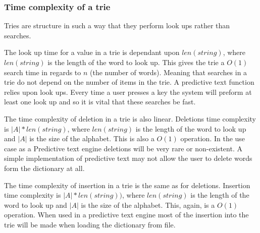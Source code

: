\documentclass[10pt]{article} %
\begin{document}
			\subsubsection{Time complexity of a trie}
			    Tries are structure in such a way that they perform look ups rather than searches.
			
				The look up time for a value in a trie is dependant upon \begin{math}len(string)\end{math}, where \begin{math}len(string)\end{math} is the length of the word to look up\cite{book:ADS:complexity}. This gives the trie a \begin{math} O(1) \end{math} search time in regards to \begin{math} n \end{math} (the number of words). Meaning that searches in a trie do not depend on the number of items in the trie. A predictive text function relies upon look ups. Every time a user presses a key the system will preform at least one look up and so it is vital that these searches be fast. 
				
				The time complexity of deletion in a trie is also linear. Deletions time complexity is 
				\begin{math}\vert A \vert * len(string)\end{math}, where \begin{math}len(string)\end{math} is the length of the word to look up and \begin{math}\vert A \vert \end{math} is the size of the alphabet\cite{book:ADS:complexity}.
				This is also a \begin{math} O(1) \end{math} operation.
				In the use case as a Predictive text engine deletions will be very rare or non-existent.
				A simple implementation of predictive text may not allow the user to delete words form the dictionary at all. 
				
				The time complexity of insertion in a trie is the same as for deletions. Insertion time complexity is \begin{math}\vert A \vert  * len(string))\end{math}, where \begin{math}len(string)\end{math} is the length of the word to look up and \begin{math}\vert A \vert \end{math} is the size of the alphabet\cite{book:ADS:complexity}.
				This, again, is a \begin{math} O(1) \end{math} operation.
				When used in a predictive text engine most of the insertion into the trie will be made when loading the dictionary from file. 
				
\end{document}
